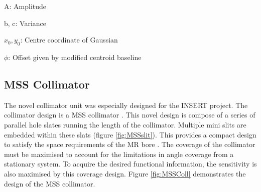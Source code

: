 \begin{description}
    \item{A}: Amplitude
    \vspace{-0.5cm}
    \item{b, c}: Variance
    \vspace{-0.5cm}
    \item{$x_{0}, y_{0}$}: Centre coordinate of Gaussian
   \vspace{-0.5cm}
    \item{$\phi$}: Offset given by modified centroid baseline
\end{description}

\subsection{MSS Collimator}
The novel collimator unit was especially designed for the INSERT project. The collimator design is a \acrshort{MSS} collimator \cite{7181734}. This novel design is compose of a series of parallel hole slates running the length of the collimator. Multiple mini slits are embedded within these slats (figure \ref{fig:MSSslit}). This provides a compact design to satisfy the space requirements of the \acrshort{MR} bore \cite{Metzler2010SlitSlatAM}. The coverage of the collimator must be maximised to account for the limitations in angle coverage from a stationary system. To acquire the desired functional information, the sensitivity is also maximised by this coverage design. Figure \ref{fig:MSSColl} demonstrates the design of the MSS collimator.

